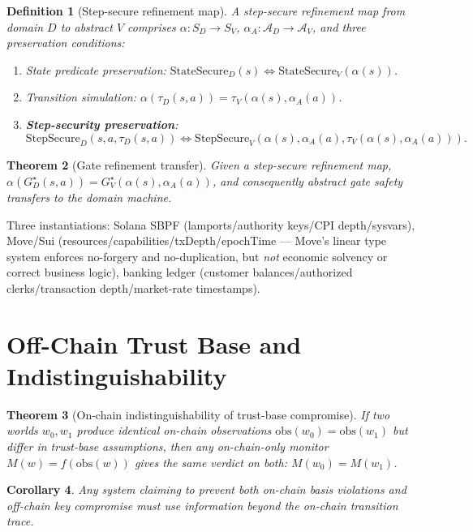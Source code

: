 \documentclass[11pt,a4paper]{article}
\newtheorem{theorem}{Theorem}
\newtheorem{definition}[theorem]{Definition}
\newtheorem{corollary}[theorem]{Corollary}
\begin{document}
\begin{definition}[Step-secure refinement map]
A step-secure refinement map from domain $D$ to abstract $V$ comprises $\alpha: S_D \to S_V$, $\alpha_A: \mathcal{A}_D \to \mathcal{A}_V$, and three preservation conditions:
\begin{enumerate}
  \item State predicate preservation: $\mathrm{StateSecure}_D(s) \iff \mathrm{StateSecure}_V(\alpha(s))$.
  \item Transition simulation: $\alpha(\tau_D(s, a)) = \tau_V(\alpha(s), \alpha_A(a))$.
  \item \textbf{Step-security preservation}:
  \[ \mathrm{StepSecure}_D(s, a, \tau_D(s, a)) \iff \mathrm{StepSecure}_V(\alpha(s), \alpha_A(a), \tau_V(\alpha(s), \alpha_A(a))). \]
\end{enumerate}
\end{definition}

\begin{theorem}[Gate refinement transfer]\label{thm:refinement}
Given a step-secure refinement map, $\alpha(G_D^\star(s, a)) = G_V^\star(\alpha(s), \alpha_A(a))$, and consequently abstract gate safety transfers to the domain machine.
\end{theorem}

Three instantiations: Solana SBPF (lamports/authority keys/CPI depth/sysvars), Move/Sui (resources/capabilities/txDepth/epochTime — Move's linear type system enforces no-forgery and no-duplication, but \emph{not} economic solvency or correct business logic), banking ledger (customer balances/authorized clerks/transaction depth/market-rate timestamps).

\section{Off-Chain Trust Base and Indistinguishability}\label{sec:offchain}

\begin{theorem}[On-chain indistinguishability of trust-base compromise]\label{thm:offchain-indist}
If two worlds $w_0, w_1$ produce identical on-chain observations $\mathrm{obs}(w_0) = \mathrm{obs}(w_1)$ but differ in trust-base assumptions, then any on-chain-only monitor $M(w) = f(\mathrm{obs}(w))$ gives the same verdict on both: $M(w_0) = M(w_1)$.
\end{theorem}

\begin{corollary}
Any system claiming to prevent both on-chain basis violations and off-chain key compromise must use information beyond the on-chain transition trace.
\end{corollary}
\end{document}
